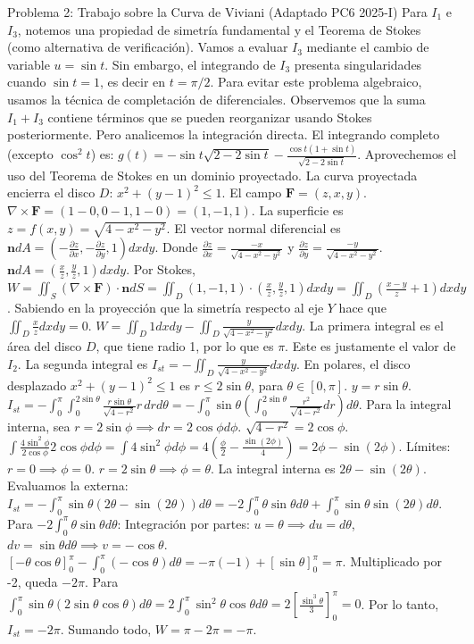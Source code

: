 \documentclass[11pt,a4paper]{article}
\begin{document}
\begin{ejerciciobox}{Problema 2: Trabajo sobre la Curva de Viviani (Adaptado PC6 2025-I)}
Para $I_1$ e $I_3$, notemos una propiedad de simetría fundamental y el Teorema de Stokes (como alternativa de verificación).
Vamos a evaluar $I_3$ mediante el cambio de variable $u = \sin t$.
Sin embargo, el integrando de $I_3$ presenta singularidades cuando $\sin t = 1$, es decir en $t = \pi/2$.
Para evitar este problema algebraico, usamos la técnica de completación de diferenciales.
Observemos que la suma $I_1 + I_3$ contiene términos que se pueden reorganizar usando Stokes posteriormente. Pero analicemos la integración directa.
El integrando completo (excepto $\cos^2 t$) es:
$g(t) = -\sin t \sqrt{2-2\sin t} - \frac{\cos t(1+\sin t)}{\sqrt{2-2\sin t}}$.
Aprovechemos el uso del Teorema de Stokes en un dominio proyectado.
La curva proyectada encierra el disco $D$: $x^2+(y-1)^2 \le 1$.
El campo $\mathbf{F}=(z, x, y)$. $\nabla \times \mathbf{F} = (1-0, 0-1, 1-0) = (1, -1, 1)$.
La superficie es $z = f(x,y) = \sqrt{4 - x^2 - y^2}$. El vector normal diferencial es $\mathbf{n} dA = \left( -\frac{\partial z}{\partial x}, -\frac{\partial z}{\partial y}, 1 \right) dx dy$.
Donde $\frac{\partial z}{\partial x} = \frac{-x}{\sqrt{4-x^2-y^2}}$ y $\frac{\partial z}{\partial y} = \frac{-y}{\sqrt{4-x^2-y^2}}$.
$\mathbf{n} dA = \left( \frac{x}{z}, \frac{y}{z}, 1 \right) dx dy$.
Por Stokes, $W = \iint_S (\nabla\times\mathbf{F})\cdot \mathbf{n} dS = \iint_D (1, -1, 1) \cdot \left( \frac{x}{z}, \frac{y}{z}, 1 \right) dx dy = \iint_D \left( \frac{x-y}{z} + 1 \right) dx dy$.
Sabiendo en la proyección que la simetría respecto al eje $Y$ hace que $\iint_D \frac{x}{z} dx dy = 0$.
$W = \iint_D 1 dx dy - \iint_D \frac{y}{\sqrt{4-x^2-y^2}} dx dy$.
La primera integral es el área del disco $D$, que tiene radio 1, por lo que es $\pi$. Este es justamente el valor de $I_2$.
La segunda integral es $I_{st} = -\iint_D \frac{y}{\sqrt{4-x^2-y^2}} dx dy$.
En polares, el disco desplazado $x^2+(y-1)^2 \le 1$ es $r \le 2\sin\theta$, para $\theta \in [0, \pi]$.
$y = r\sin\theta$.
$I_{st} = -\int_0^\pi \int_0^{2\sin\theta} \frac{r\sin\theta}{\sqrt{4-r^2}} r \, dr d\theta = -\int_0^\pi \sin\theta \left( \int_0^{2\sin\theta} \frac{r^2}{\sqrt{4-r^2}} dr \right) d\theta$.
Para la integral interna, sea $r = 2\sin\phi \implies dr = 2\cos\phi d\phi$.
$\sqrt{4-r^2} = 2\cos\phi$.
$\int \frac{4\sin^2\phi}{2\cos\phi} 2\cos\phi d\phi = \int 4\sin^2\phi d\phi = 4\left( \frac{\phi}{2} - \frac{\sin(2\phi)}{4} \right) = 2\phi - \sin(2\phi)$.
Límites: $r=0 \implies \phi=0$. $r=2\sin\theta \implies \phi=\theta$.
La integral interna es $2\theta - \sin(2\theta)$.
Evaluamos la externa:
$I_{st} = -\int_0^\pi \sin\theta (2\theta - \sin(2\theta)) d\theta = -2\int_0^\pi \theta\sin\theta d\theta + \int_0^\pi \sin\theta\sin(2\theta) d\theta$.
Para $-2\int_0^\pi \theta\sin\theta d\theta$:
Integración por partes: $u=\theta \implies du=d\theta$, $dv=\sin\theta d\theta \implies v=-\cos\theta$.
$[- \theta\cos\theta]_0^\pi - \int_0^\pi (-\cos\theta) d\theta = -\pi(-1) + [\sin\theta]_0^\pi = \pi$. Multiplicado por -2, queda $-2\pi$.
Para $\int_0^\pi \sin\theta(2\sin\theta\cos\theta) d\theta = 2\int_0^\pi \sin^2\theta\cos\theta d\theta = 2\left[\frac{\sin^3\theta}{3}\right]_0^\pi = 0$.
Por lo tanto, $I_{st} = -2\pi$.
Sumando todo, $W = \pi - 2\pi = -\pi$.


\end{ejerciciobox}
\end{document}
